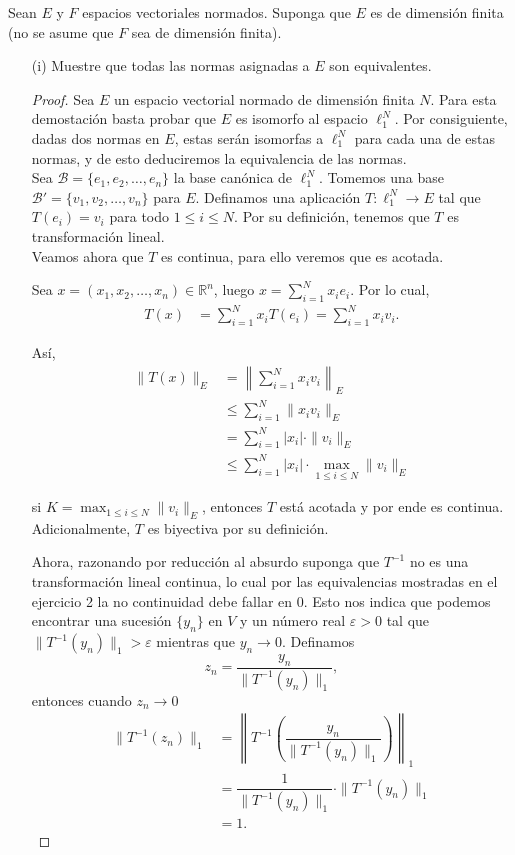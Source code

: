 Sean $E$ y $F$ espacios vectoriales normados. Suponga que $E$ es de dimensión finita (no se asume que $F$ sea de dimensión finita).

\begin{enumerate}
    \item[(i)] Muestre que todas las normas asignadas a $E$ son equivalentes.
    \begin{proof}
    Sea $E$ un espacio vectorial normado de dimensión finita $N$. Para esta demostación basta probar que $E$ es isomorfo al espacio $\ell_1^N$. Por consiguiente, dadas dos normas en $E$, estas serán isomorfas a $\ell_1^N$ para cada una de estas normas, y de esto deduciremos la equivalencia de las normas.\\

Sea $\mathcal{B} = \{e_1, e_2, \ldots, e_n\}$ la base canónica de $\ell_1^N$. Tomemos una base $\mathcal{B}' = \{v_1, v_2, \ldots, v_n\}$ para $E$. Definamos una aplicación  $T: \ell_1^N \to E$ tal que $T(e_i) = v_i$ para todo $1 \leq i \leq N$. Por su definición, tenemos que $T$ es transformación lineal.\\

Veamos ahora que $T$ es continua, para ello veremos que es acotada.

Sea $x = (x_1, x_2, \ldots, x_n) \in \mathbb{R}^n$, luego $x = \displaystyle\sum_{i=1}^N x_i e_i$. Por lo cual,
\begin{align*}
T(x) &= \sum_{i=1}^N x_i T(e_i) = \sum_{i=1}^N x_i v_i.
\end{align*}

Así,
\begin{align*}
\|T(x)\|_E 
&= \left\| \sum_{i=1}^N x_i v_i \right\|_E \\
&\leq \sum_{i=1}^N \|x_i v_i\|_E \\
&= \sum_{i=1}^N |x_i| \cdot \|v_i\|_E \\
&\leq \sum_{i=1}^N |x_i| \cdot \max_{1 \leq i \leq N} \|v_i\|_E
\end{align*}

si $K = \max_{1 \leq i \leq N} \|v_i\|_E$, entonces $T$ está acotada y por ende es continua. Adicionalmente, $T$ es biyectiva por su definición.

Ahora, razonando por reducción al absurdo suponga que $T^{-1}$ no es una transformación lineal continua, lo cual por las equivalencias mostradas en el ejercicio 2 la no continuidad debe fallar en 0. Esto nos indica que podemos encontrar una sucesión $\{y_n\}$ en $V$ y un número real $\varepsilon > 0$ tal que $\|T^{-1}(y_n)\|_1 > \varepsilon$ mientras que $y_n \to 0$. Definamos 
$$
z_n = \frac{y_n}{\|T^{-1}(y_n)\|_1},
$$
entonces cuando $z_n \to 0$  
\begin{align*}
\|T^{-1}(z_n)\|_1 
&= \left\|T^{-1}\left(\dfrac{y_n}{\|T^{-1}(y_n)\|_1}\right)\right\|_1 \\
&= \dfrac{1}{\|T^{-1}(y_n)\|_1} \cdot \|T^{-1}(y_n)\|_1 \\
&= 1.
\end{align*}


\end{proof}
\end{enumerate}
